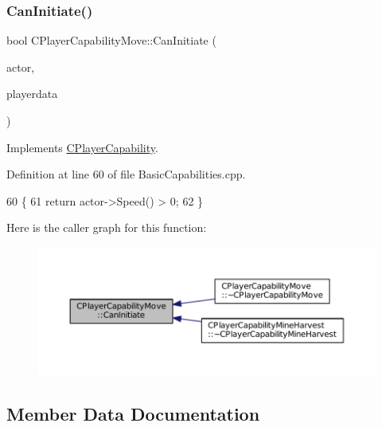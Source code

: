\subsubsection{\texorpdfstring{Can\+Initiate()}{CanInitiate()}}
{\footnotesize\ttfamily bool C\+Player\+Capability\+Move\+::\+Can\+Initiate (\begin{DoxyParamCaption}\item[{std\+::shared\+\_\+ptr$<$ \hyperlink{classCPlayerAsset}{C\+Player\+Asset} $>$}]{actor,  }\item[{std\+::shared\+\_\+ptr$<$ \hyperlink{classCPlayerData}{C\+Player\+Data} $>$}]{playerdata }\end{DoxyParamCaption})\hspace{0.3cm}{\ttfamily [virtual]}}



Implements \hyperlink{classCPlayerCapability_aa83b1e1fcaff2985c378132d679154ea}{C\+Player\+Capability}.



Definition at line 60 of file Basic\+Capabilities.\+cpp.


\begin{DoxyCode}
60                                                                                                            
              \{
61     \textcolor{keywordflow}{return} actor->Speed() > 0;
62 \}
\end{DoxyCode}
Here is the caller graph for this function\+:
\nopagebreak
\begin{figure}[H]
\begin{center}
\leavevmode
\includegraphics[width=350pt]{classCPlayerCapabilityMove_aef25bc0d224e993c46f5cd4cd6b8b7c8_icgraph}
\end{center}
\end{figure}


\subsection{Member Data Documentation}
\hypertarget{classCPlayerCapabilityMove_a6b1de1f3d299621bc3d6020111bb8253}{}\label{classCPlayerCapabilityMove_a6b1de1f3d299621bc3d6020111bb8253} 
